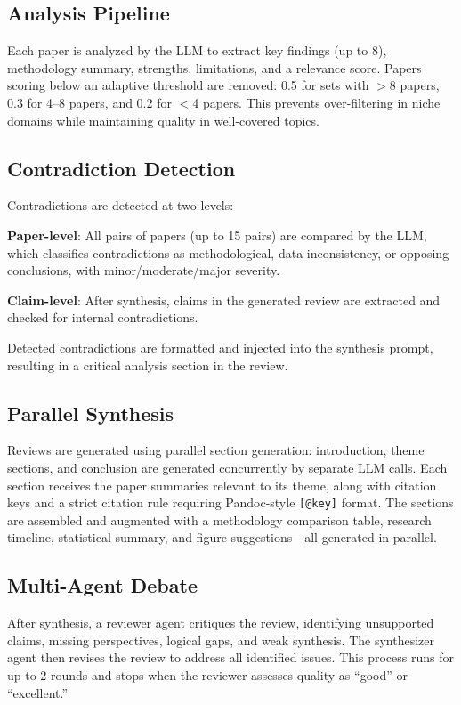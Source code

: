 \documentclass[11pt]{article}
\begin{document}
\subsection{Analysis Pipeline}

Each paper is analyzed by the LLM to extract key findings (up to 8), methodology summary, strengths, limitations, and a relevance score. Papers scoring below an adaptive threshold are removed: 0.5 for sets with $>$8 papers, 0.3 for 4--8 papers, and 0.2 for $<$4 papers. This prevents over-filtering in niche domains while maintaining quality in well-covered topics.

\subsection{Contradiction Detection}

Contradictions are detected at two levels:

\textbf{Paper-level}: All pairs of papers (up to 15 pairs) are compared by the LLM, which classifies contradictions as methodological, data inconsistency, or opposing conclusions, with minor/moderate/major severity.

\textbf{Claim-level}: After synthesis, claims in the generated review are extracted and checked for internal contradictions.

Detected contradictions are formatted and injected into the synthesis prompt, resulting in a critical analysis section in the review.

\subsection{Parallel Synthesis}

Reviews are generated using parallel section generation: introduction, theme sections, and conclusion are generated concurrently by separate LLM calls. Each section receives the paper summaries relevant to its theme, along with citation keys and a strict citation rule requiring Pandoc-style \texttt{[@key]} format. The sections are assembled and augmented with a methodology comparison table, research timeline, statistical summary, and figure suggestions---all generated in parallel.

\subsection{Multi-Agent Debate}

After synthesis, a reviewer agent critiques the review, identifying unsupported claims, missing perspectives, logical gaps, and weak synthesis. The synthesizer agent then revises the review to address all identified issues. This process runs for up to 2 rounds and stops when the reviewer assesses quality as ``good'' or ``excellent.''
\end{document}
